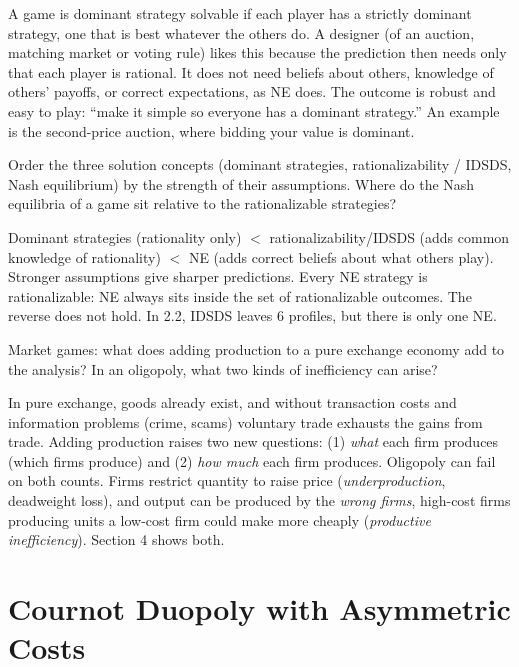 \begin{description}
\begin{solution}
A game is dominant strategy solvable if each player has a strictly dominant strategy, one that is best whatever the others do. A designer (of an auction, matching market or voting rule) likes this because the prediction then needs only that each player is rational. It does not need beliefs about others, knowledge of others' payoffs, or correct expectations, as NE does. The outcome is robust and easy to play: ``make it simple so everyone has a dominant strategy.'' An example is the second-price auction, where bidding your value is dominant.
\end{solution}
\item[3.3] Order the three solution concepts (dominant strategies, rationalizability / IDSDS, Nash equilibrium) by the strength of their assumptions. Where do the Nash equilibria of a game sit relative to the rationalizable strategies?
\begin{solution}
Dominant strategies (rationality only) $<$ rationalizability/IDSDS (adds common knowledge of rationality) $<$ NE (adds correct beliefs about what others play). Stronger assumptions give sharper predictions. Every NE strategy is rationalizable: NE always sits inside the set of rationalizable outcomes. The reverse does not hold. In 2.2, IDSDS leaves 6 profiles, but there is only one NE.
\end{solution}
\item[3.4] Market games: what does adding production to a pure exchange economy add to the analysis? In an oligopoly, what two kinds of inefficiency can arise?
\begin{solution}
In pure exchange, goods already exist, and without transaction costs and information problems (crime, scams) voluntary trade exhausts the gains from trade. Adding production raises two new questions: (1) \emph{what} each firm produces (which firms produce) and (2) \emph{how much} each firm produces. Oligopoly can fail on both counts. Firms restrict quantity to raise price (\emph{underproduction}, deadweight loss), and output can be produced by the \emph{wrong firms}, high-cost firms producing units a low-cost firm could make more cheaply (\emph{productive inefficiency}). Section 4 shows both.
\end{solution}
\end{description}

\section{Cournot Duopoly with Asymmetric Costs}

